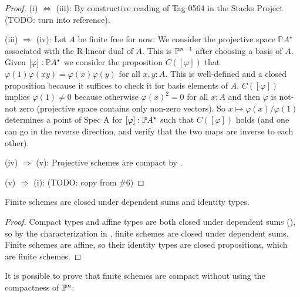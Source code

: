 \begin{proof}
  (i) $\Leftrightarrow$ (iii): By constructive reading of Tag 0564 in the Stacks Project (TODO: turn into reference).
  
  (iii) $\Rightarrow$ (iv): Let $A$ be finite free for now.
  We consider the projective space $\mathbb PA^\star$ associated with the R-linear dual of $A$.
  This is $\mathbb{P}^{n-1}$ after choosing a basis of $A$.
  Given $[\varphi] : \mathbb{P} A^\star$ we consider the proposition $C([\varphi])$ that $\varphi(1) \varphi(xy) = \varphi(x) \varphi(y)$ for all $x, y  : A$.
  This is well-defined and a closed proposition because it suffices to check it for basis elements of $A$.
  $C([\varphi])$ implies $\varphi(1) \ne 0$ because otherwise $\varphi(x)^2 = 0$ for all $x : A$ and then $\varphi$ is not-not zero (projective space contains only non-zero vectors).
  So $x \mapsto \varphi(x) / \varphi(1)$ determines a point of Spec A for $[\varphi] : \mathbb{P} A^\star$ such that $C([\varphi])$ holds (and one can go in the reverse direction, and verify that the two maps are inverse to each other).
  

  (iv) $\Rightarrow$ (v): Projective schemes are compact by \cite[Theorem 3.0.7]{proper-draft}. 
  
  (v) $\Rightarrow$ (i): (TODO: copy from \#6)
\end{proof}

\begin{lemma}
  Finite schemes are closed under dependent sums and identity types.
\end{lemma}

\begin{proof}
  Compact types and affine types are both closed under dependent sums (\cite[Lemma 2.0.3]{proper-draft}), so by the characterization in ,
  finite schemes are closed under dependent sums.
  Finite schemes are affine, so their identity types are closed propositions, which are finite schemes.
\end{proof}

It is possible to prove that finite schemes are compact without using the compactness of $\mathbb{P}^n$:

